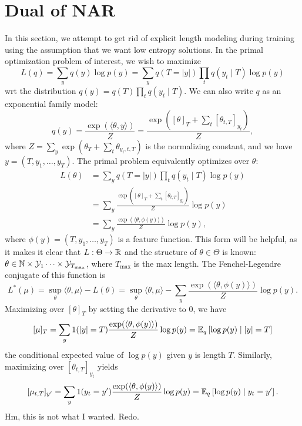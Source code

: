 \documentclass[11pt]{article}
\begin{document}
\section{Dual of NAR}
In this section, we attempt to get rid of explicit length modeling during training
using the assumption that we want low entropy solutions.
In the primal optimization problem of interest, we wish to maximize
\begin{equation}
    L(q) = \sum_{y} q(y) \log p(y)
    = \sum_{y} q(T = |y|) \prod_t q(y_t \mid T)\log p(y)
\end{equation}
wrt the distribution $q(y) = q(T)\prod_t q(y_t \mid T)$.
We can also write $q$ as an exponential family model:
$$q(y)
= \frac{\exp(\langle \theta, y \rangle)}{Z}
= \frac{\exp([\theta]_T + \sum_t [\theta_{t, T}]_{y_t})}{Z},
$$
where $Z = \sum_y \exp(\theta_T + \sum_t \theta_{y_t,t,T})$ is the normalizing constant,
and we have $y = (T, y_1, \ldots, y_T)$.
The primal problem equivalently optimizes over $\theta$:
\begin{equation}
    \begin{aligned}
    L(\theta)
    &= \sum_{y} q(T = |y|) \prod_t q(y_t \mid T)\log p(y)\\
    &= \sum_y \frac{\exp([\theta]_T + \sum_t [\theta_{t,T}]_{y_t})}{Z} \log p(y)\\
    &= \sum_y \frac{\exp(\langle\theta, \phi(y)\rangle)}{Z} \log p(y),
    \end{aligned}
\end{equation}
where $\phi(y) = (T, y_1, \ldots, y_T)$ is a feature function.
This form will be helpful, as it makes it clear that $L: \Theta\to\mathbb{R}$
and the structure of $\theta\in\Theta$ is known:
$\theta\in\mathbb{N}\times\mathcal{Y}_1\cdots\times\mathcal{Y}_{T_{\max}}$, where $T_{\max}$ is the max length.
The Fenchel-Legendre conjugate of this function is
\begin{equation}
    L^*(\mu) = \sup_\theta \langle \theta, \mu\rangle - L(\theta)
        = \sup_\theta \langle \theta, \mu\rangle - \sum_y\frac{\exp(\langle\theta,\phi(y)\rangle)}{Z} \log p(y).
\end{equation}
Maximizing over $[\theta]_T$ by setting the derivative to 0, we have
$$
[\mu]_T = \sum_y 1(|y| = T)\frac{\exp(\langle\theta,\phi(y)\rangle)}{Z} \log p(y)
= \mathbb{E}_{q}\left[\log p(y) \mid |y| = T\right]
$$
the conditional expected value of $\log p(y)$ given $y$ is length $T$.
Similarly, maximizing over $[\theta_{t,T}]_{y_t}$ yields
$$
[\mu_{t,T}]_{y'} = \sum_y 1(y_t = y')\frac{\exp(\langle\theta,\phi(y)\rangle)}{Z} \log p(y)
= \mathbb{E}_{q}\left[\log p(y) \mid y_t = y'\right].
$$
Hm, this is not what I wanted. Redo.
\end{document}
